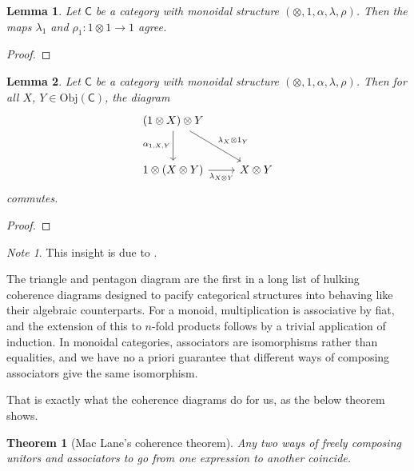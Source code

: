 \documentclass[a4paper,10pt]{scrreprt}
\newcommand{\Obj}{\mathrm{Obj}}
\theoremstyle{definition}
\theoremstyle{plain}
\newtheorem{theorem}{Theorem}[section]
\newtheorem{lemma}{Lemma}[section]
\theoremstyle{remark}
\newtheorem{note}{Note}[section]
\begin{document}
\begin{lemma}
  \label{lemma:leftandrightunitoragreewhenpossible}
  Let $\mathsf{C}$ be a category with monoidal structure $(\otimes, 1, \alpha, \lambda, \rho)$. Then the maps $\lambda_{1}$ and $\rho_{1}\colon 1 \otimes 1 \to 1$ agree.
\end{lemma}
\begin{proof}

\end{proof}

\begin{lemma}
  Let $\mathsf{C}$ be a category with monoidal structure $(\otimes, 1, \alpha, \lambda, \rho)$. Then for all $X$, $Y \in \Obj(\mathsf{C})$, the diagram
  \begin{equation*}
    \begin{tikzcd}[row sep=large]
      (1 \otimes X) \otimes Y 
      \arrow[d, swap, "{\alpha_{1, X, Y}}"]
      \arrow[dr, "\lambda_{X} \otimes 1_{Y}"]
      & 
      \\
      1 \otimes (X \otimes Y)
      \arrow[r, swap, "\lambda_{X \otimes Y}"]
      & X \otimes Y
    \end{tikzcd}
  \end{equation*}
  commutes.
\end{lemma}
\begin{proof}

\end{proof}

\begin{note}
  This insight is due to \cite{unapolagetic-mathematician-mac-lanes-theorem}.

  The triangle and pentagon diagram are the first in a long list of hulking coherence diagrams designed to pacify categorical structures into behaving like their algebraic counterparts. For a monoid, multiplication is associative by fiat, and the extension of this to $n$-fold products follows by a trivial application of induction. In monoidal categories, associators are isomorphisms rather than equalities, and we have no a priori guarantee that different ways of composing associators give the same isomorphism. 

  That is exactly what the coherence diagrams do for us, as the below theorem shows.
\end{note}

\begin{theorem}[Mac Lane's coherence theorem]
  Any two ways of freely composing unitors and associators to go from one expression to another coincide.
\end{theorem}
\end{document}
